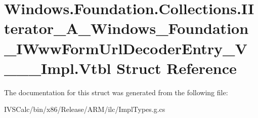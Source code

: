 \hypertarget{struct_windows_1_1_foundation_1_1_collections_1_1_i_iterator___a___windows___foundation___i_www_d07cbf0006de1eb6dcd626b899b96b5d}{}\section{Windows.\+Foundation.\+Collections.\+I\+Iterator\+\_\+\+A\+\_\+\+Windows\+\_\+\+Foundation\+\_\+\+I\+Www\+Form\+Url\+Decoder\+Entry\+\_\+\+V\+\_\+\+\_\+\+\_\+\+Impl.\+Vtbl Struct Reference}
\label{struct_windows_1_1_foundation_1_1_collections_1_1_i_iterator___a___windows___foundation___i_www_d07cbf0006de1eb6dcd626b899b96b5d}


The documentation for this struct was generated from the following file\+:\begin{DoxyCompactItemize}
\item 
I\+V\+S\+Calc/bin/x86/\+Release/\+A\+R\+M/ilc/Impl\+Types.\+g.\+cs\end{DoxyCompactItemize}
